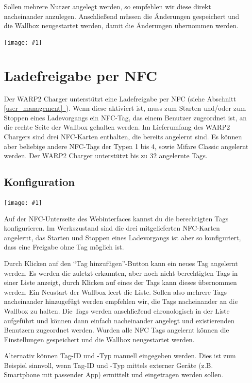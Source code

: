\documentclass[a4paper,10pt]{article}
\newcommand{\gfx}[1]{\texttt{[image: \#1]}}
\newcommand*{\fullref}[1]{Abschnitt \hyperref[{#1}]{\ref*{#1}~\nameref*{#1}}}
\begin{document}
\begin{multicols*}{2}
    Sollen mehrere Nutzer angelegt werden, so empfehlen wir diese direkt
    nacheinander anzulegen. Anschließend müssen die Änderungen gespeichert und
    die Wallbox neugestartet werden, damit die Änderungen übernommen werden.

    \gfx{./img_warp2/resized/web_users}

    \newpage
    \section{Ladefreigabe per NFC}
    \label{NFC}
    Der WARP2 Charger unterstützt eine Ladefreigabe per NFC (siehe \fullref{user_management}).
    Wenn diese aktiviert ist,
    muss zum Starten und/oder zum Stoppen eines Ladevorgangs ein NFC-Tag, das einem Benutzer zugeordnet ist, an die rechte Seite
    der Wallbox gehalten werden. Im Lieferumfang des WARP2 Chargers sind drei NFC-Karten enthalten,
    die bereits angelernt sind. Es können aber beliebige andere NFC-Tags der Typen 1 bis 4,
    sowie Mifare Classic angelernt werden. Der WARP2 Charger unterstützt bis zu 32 angelernte Tags.

    \subsection{Konfiguration}
    \gfx{./img_warp2/resized/web_nfc}

    Auf der NFC-Unterseite des Webinterfaces kannst du die berechtigten Tags konfigurieren.
    Im Werkszustand sind die drei mitgelieferten NFC-Karten angelernt,
    das Starten und Stoppen eines Ladevorgangs ist aber so konfiguriert, dass eine
    Freigabe ohne Tag möglich ist.

    Durch Klicken auf den \enquote{Tag hinzufügen}-Button kann ein neues Tag angelernt werden.
    Es werden die zuletzt erkannten, aber noch nicht berechtigten Tags in einer
    Liste anzeigt, durch Klicken auf eines der Tags kann dieses übernommen werden. Ein Neustart der
    Wallbox leert die Liste. Sollen also mehrere Tags nacheinander hinzugefügt
    werden empfehlen wir, die Tags nacheinander an die Wallbox zu halten. Die
    Tags werden anschließend chronologisch in der Liste aufgeführt und können
    dann einfach nacheinander angelegt und existierenden Benutzern zugeordnet
    werden. Wurden alle NFC Tags angelernt können die Einstellungen gespeichert und die
    Wallbox neugestartet werden.

    \columnbreak

    Alternativ können Tag-ID und -Typ manuell eingegeben werden. Dies ist zum Beispiel sinnvoll,
    wenn Tag-ID und -Typ mittels externer Geräte (z.B. Smartphone mit passender
    App) ermittelt und eingetragen werden sollen.


\end{multicols*}
\end{document}
